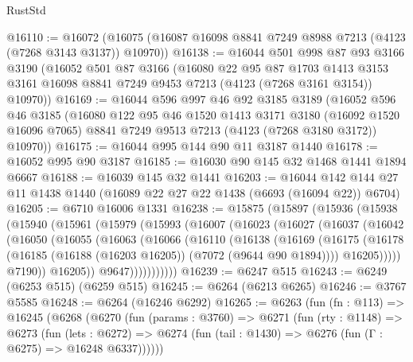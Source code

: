 \begin{lexlean}{RustStd}
\begin{coremodule}
@16110 := @16072 (@16075 (@16087 @16098 @8841 @7249 @8988 @7213 (@4123 (@7268 @3143 @3137)) @10970))
@16138 := @16044
    @501
    @998
    @87
    @93
    @3166
    @3190
    (@16052
      @501
      @87
      @3166
      (@16080
        @22
        @95
        @87
        @1703
        @1413
        @3153
        @3161
        @16098
        @8841
        @7249
        @9453
        @7213
        (@4123 (@7268 @3161 @3154))
        @10970))
@16169 := @16044
    @596
    @997
    @46
    @92
    @3185
    @3189
    (@16052
      @596
      @46
      @3185
      (@16080
        @122
        @95
        @46
        @1520
        @1413
        @3171
        @3180
        (@16092 @1520 @16096 @7065)
        @8841
        @7249
        @9513
        @7213
        (@4123 (@7268 @3180 @3172))
        @10970))
@16175 := @16044 @995 @144 @90 @11 @3187 @1440
@16178 := @16052 @995 @90 @3187
@16185 := @16030 @90 @145 @32 @1468 @1441 @1894 @6667
@16188 := @16039 @145 @32 @1441
@16203 := @16044 @142 @144 @27 @11 @1438 @1440 (@16089 @22 @27 @22 @1438 (@6693 (@16094 @22)) @6704)
@16205 := @6710 @16006 @1331
@16238 := @15875
    (@15897
      (@15936
        (@15938
          (@15940
            (@15961
              (@15979
                (@15993
                  (@16007
                    (@16023
                      (@16027
                        (@16037
                          (@16042
                            (@16050
                              (@16055
                                (@16063
                                  (@16066
                                    (@16110
                                      (@16138
                                        (@16169
                                          (@16175
                                            (@16178
                                              (@16185
                                                (@16188 (@16203 @16205))
                                                (@7072 (@9644 @90 @1894))))
                                            @16205)))))
                                  @7190))
                              @16205))
                          @9647)))))))))))
@16239 := @6247 @515
@16243 := @6249 (@6253 @515) (@6259 @515)
@16245 := @6264 (@6213 @6265)
@16246 := @3767 @5585
@16248 := @6264 (@16246 @6292)
@16265 := @6263
    (fun (fn : @113) =>
    @16245
      (@6268
        (@6270
          (fun (params : @3760) =>
          @6271
            (fun (rty : @1148) =>
            @6273
              (fun (lets : @6272) =>
              @6274 (fun (tail : @1430) => @6276 (fun (Γ : @6275) => @16248 @6337))))))

\end{coremodule}
\end{lexlean}
